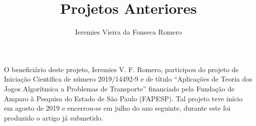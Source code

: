 \documentclass[11pt]{article}
\author{Ieremies Vieira da Fonseca Romero}
\date{}
\title{Projetos Anteriores}
\begin{document}
\maketitle
O beneficiário deste projeto, Ieremies V. F. Romero, participou do projeto de Iniciação Científica de número 2019/14492-9 e de título ``Aplicações de Teoria dos Jogos Algorítmica a Problemas de Transporte'' financiado pela Fundação de Amparo à Pesquisa do Estado de São Paulo (FAPESP).
Tal projeto teve início em agosto de 2019 e encerrou-se em julho do ano seguinte, durante este foi produzido o artigo \cite{Silva2020TightBoundsPrice} já submetido.

\printbibliography
\end{document}
